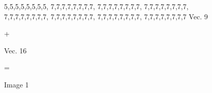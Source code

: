 \documentclass[12pt]{report}
\begin{document}
\begin{figure}[H]
\begin{minipage}{0.1\textwidth}
{                        {5,5,5,5,5,5,5,5},
                        {7,7,7,7,7,7,7,7},
                        {7,7,7,7,7,7,7,7},
                        {7,7,7,7,7,7,7,7},
                        {7,7,7,7,7,7,7,7},
                        {7,7,7,7,7,7,7,7},
                        {7,7,7,7,7,7,7,7},
                        {7,7,7,7,7,7,7,7}%
                    }
                    Vec. 9
                \end{minipage}
                \begin{minipage}{0.035\textwidth}
                    \centering
                    \quad+\quad
                \end{minipage}
                \begin{minipage}{0.1\textwidth}
                    \centering
                    Vec. 16
                \end{minipage}
                \begin{minipage}{0.035\textwidth}
                    \centering
                    \quad=\quad
                \end{minipage}
                \begin{minipage}{0.1\textwidth}
                    \centering
                    Image 1
                \end{minipage}%
            \end{figure}
\end{document}
